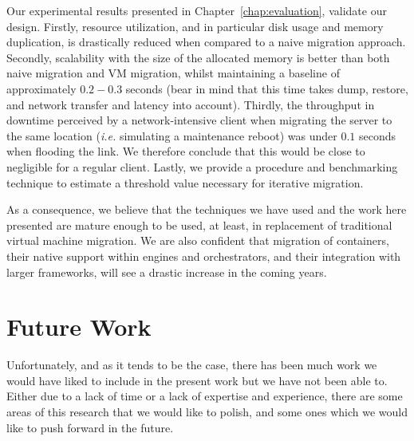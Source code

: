 Our experimental results presented in Chapter~\ref{chap:evaluation}, validate our design.
Firstly, resource utilization, and in particular disk usage and memory duplication, is drastically reduced when compared to a naive migration approach.
Secondly, scalability with the size of the allocated memory is better than both naive migration and VM migration, whilst maintaining a baseline of approximately $0.2-0.3$ seconds (bear in mind that this time takes dump, restore, and network transfer and latency into account).
Thirdly, the throughput in downtime perceived by a network-intensive client when migrating the server to the same location (\textit{i.e.} simulating a maintenance reboot) was under $0.1$ seconds when flooding the link.
We therefore conclude that this would be close to negligible for a regular client.
Lastly, we provide a procedure and benchmarking technique to estimate a threshold value necessary for iterative migration.

As a consequence, we believe that the techniques we have used and the work here presented are mature enough to be used, at least, in replacement of traditional virtual machine migration.
We are also confident that migration of containers, their native support within engines and orchestrators, and their integration with larger frameworks, will see a drastic increase in the coming years.

\section{Future Work} \label{sec:conc-fw}

Unfortunately, and as it tends to be the case, there has been much work we would have liked to include in the present work but we have not been able to.
Either due to a lack of time or a lack of expertise and experience, there are some areas of this research that we would like to polish, and some ones which we would like to push forward in the future.

